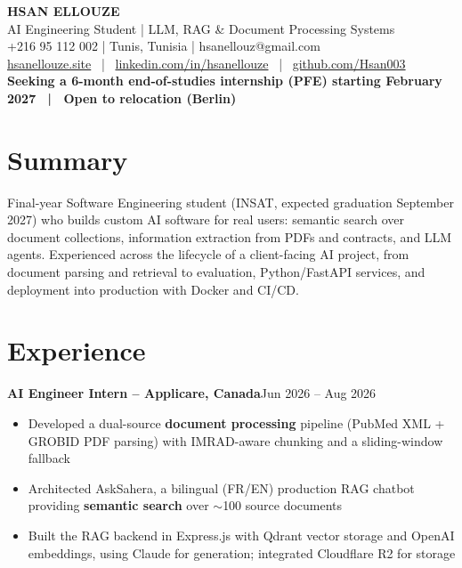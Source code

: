 \documentclass[10pt,a4paper]{article}
\newcommand{\entry}[2]{\vspace{1pt}\noindent\textbf{#1}\hfill{\color{muted}#2}\par}
\begin{document}
\begin{center}
  {\LARGE\bfseries HSAN ELLOUZE}\\[2pt]
  {\color{muted} AI Engineering Student | LLM, RAG \& Document Processing Systems}\\[2pt]
  {\footnotesize +216 95 112 002 | Tunis, Tunisia | hsanellouz@gmail.com}\\[1pt]
  {\footnotesize \href{https://hsanellouze.site}{hsanellouze.site} \ | \ \href{https://linkedin.com/in/hsanellouze}{linkedin.com/in/hsanellouze} \ | \ \href{https://github.com/Hsan003}{github.com/Hsan003}}\\[3pt]
  {\footnotesize\bfseries Seeking a 6-month end-of-studies internship (PFE) starting February 2027 \ | \ Open to relocation (Berlin)}
\end{center}

\section{Summary}
Final-year Software Engineering student (INSAT, expected graduation September 2027) who builds custom AI software for real users: semantic search over document collections, information extraction from PDFs and contracts, and LLM agents. Experienced across the lifecycle of a client-facing AI project, from document parsing and retrieval to evaluation, Python/FastAPI services, and deployment into production with Docker and CI/CD.

\section{Experience}
\entry{AI Engineer Intern -- Applicare, Canada}{Jun 2026 -- Aug 2026}
\begin{itemize}
  \item Developed a dual-source \textbf{document processing} pipeline (PubMed XML + GROBID PDF parsing) with IMRAD-aware chunking and a sliding-window fallback
  \item Architected AskSahera, a bilingual (FR/EN) production RAG chatbot providing \textbf{semantic search} over $\sim$100 source documents
  \item Built the RAG backend in Express.js with Qdrant vector storage and OpenAI embeddings, using Claude for generation; integrated Cloudflare R2 for storage
\end{itemize}
\end{document}
